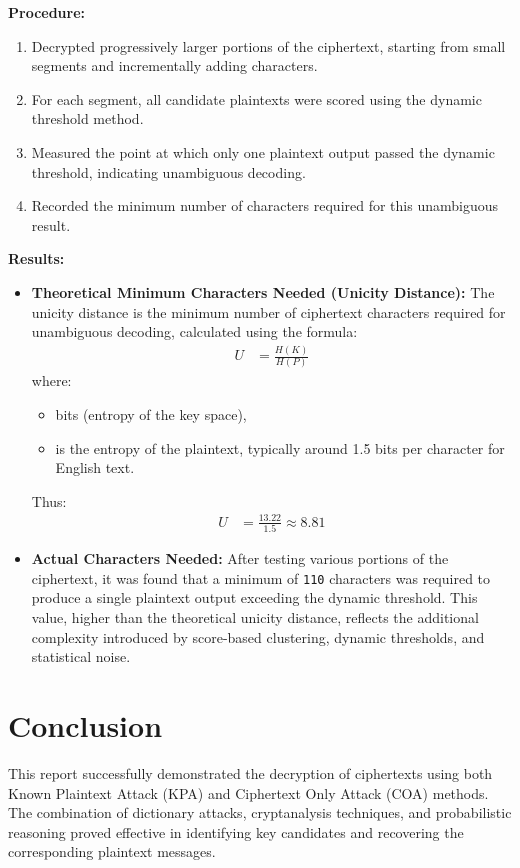 \documentclass{article}
\begin{document}
\textbf{Procedure:}
\begin{enumerate}
\item Decrypted progressively larger portions of the ciphertext, starting from small segments and incrementally adding characters.
\item For each segment, all candidate plaintexts were scored using the dynamic threshold method.
\item Measured the point at which only one plaintext output passed the dynamic threshold, indicating unambiguous decoding.
\item Recorded the minimum number of characters required for this unambiguous result.
\end{enumerate}

\textbf{Results:}
\begin{itemize}
\item \textbf{Theoretical Minimum Characters Needed (Unicity Distance):}
The unicity distance  is the minimum number of ciphertext characters required for unambiguous decoding, calculated using the formula:
\begin{align*}
U &= \frac{H(K)}{H(P)}
\end{align*}
where:
\begin{itemize}
\item  bits (entropy of the key space),
\item  is the entropy of the plaintext, typically around 1.5 bits per character for English text.
\end{itemize}
Thus:
\begin{align*}
U &= \frac{13.22}{1.5} \approx 8.81
\end{align*}

\item \textbf{Actual Characters Needed:} After testing various portions of the ciphertext, it was found that a minimum of \texttt{110} characters was required to produce a single plaintext output exceeding the dynamic threshold. This value, higher than the theoretical unicity distance, reflects the additional complexity introduced by score-based clustering, dynamic thresholds, and statistical noise.

\end{itemize}

\section{Conclusion}

This report successfully demonstrated the decryption of ciphertexts using both Known Plaintext Attack (KPA) and Ciphertext Only Attack (COA) methods. The combination of dictionary attacks, cryptanalysis techniques, and probabilistic reasoning proved effective in identifying key candidates and recovering the corresponding plaintext messages.
\end{document}
